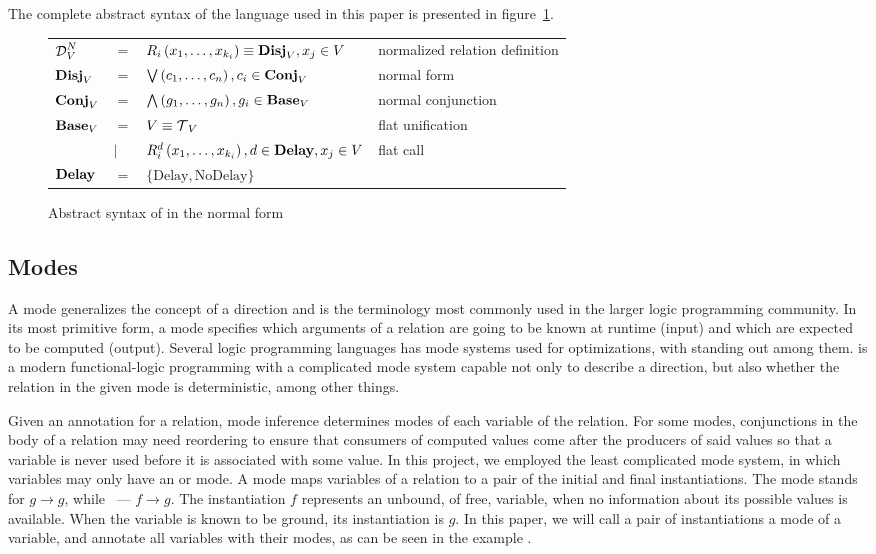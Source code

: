 The complete abstract syntax of the \mk language used in this paper is presented in figure~\ref{fig:miniKanren}. 

\begin{figure}[h]
    \begin{tabular}{llll}
     $\operatorname{\mathcal{D}}_{V}^N$ & $=$ & $R_{i}\left( x_1, \ldots, x_{k_{i}} \right) \equiv \operatorname{\mathbf{Disj}}_{V}, x_{j}\in V$ & normalized relation definition \\
    $\operatorname{\mathbf{Disj}}_{V}$ & $=$ & $\bigvee\left( c_1, \ldots, c_{n} \right), c_{i}\in \operatorname{\mathbf{Conj}}_{V}$ & normal form \\
    $\operatorname{\mathbf{Conj}}_{V}$ & $=$ & $\bigwedge\left( g_1, \ldots, g_n \right), g_{i}\in \operatorname{\mathbf{Base}}_{V}$ & normal conjunction \\
    $\operatorname{\mathbf{Base}}_{V}$ & $=$ & $V \equiv \operatorname{\mathcal{T}}_{V}$ & flat unification \\
                & $\mid$ & $R_{i}^{d}\left( x_1, \ldots, x_{k_{i}} \right), d\in \operatorname{\mathbf{Delay}}, x_{j}\in V$ & flat call\\
    
    $\operatorname{\mathbf{Delay}}$ & $=$ &  $\{\text{Delay}, \text{NoDelay}\} $ &
    \end{tabular}
    \caption{Abstract syntax of \mk in the normal form}
    \label{fig:miniKanren}
\end{figure}


\subsection{Modes}

A mode generalizes the concept of a direction and is the terminology most commonly used in the larger logic programming community. 
In its most primitive form, a mode specifies which arguments of a relation are going to be known at runtime (input) and which are expected to be computed (output).
Several logic programming languages has mode systems used for optimizations, with \merc standing out among them. 
\merc is a modern functional-logic programming with a complicated mode system capable not only to describe a direction, but also whether the relation in the given mode is deterministic, among other things. 

Given an annotation for a relation, mode inference determines modes of each variable of the relation. 
For some modes, conjunctions in the body of a relation may need reordering to ensure that consumers of computed values come after the producers of said values so that a variable is never used before it is associated with some value. 
In this project, we employed the least complicated mode system, in which variables may only have an \inm or \outm mode.
A mode maps variables of a relation to a pair of the initial and final instantiations.
The mode \inm stands for $g \rightarrow g$, while \outm~--- $f \rightarrow g$. 
The instantiation $f$ represents an unbound, of free, variable, when no information about its possible values is available. 
When the variable is known to be ground, its instantiation is $g$. 
In this paper, we will call a pair of instantiations a mode of a variable, and annotate all variables with their modes, as can be seen in the example .

